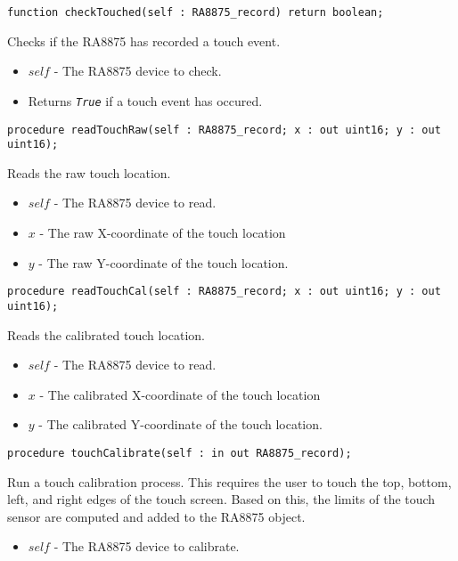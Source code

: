 \documentclass[10pt, openany]{book}
\newcommand{\constant}[1]{\emph{\texttt{#1}}}
\begin{document}
\begin{lstlisting}
function checkTouched(self : RA8875_record) return boolean;
\end{lstlisting}
Checks if the RA8875 has recorded a touch event.
\begin{itemize}
  \item $self$ - The RA8875 device to check.
  \item Returns \constant{True} if a touch event has occured.
\end{itemize}

\begin{lstlisting}
procedure readTouchRaw(self : RA8875_record; x : out uint16; y : out uint16);
\end{lstlisting}
Reads the raw touch location.
\begin{itemize}
  \item $self$ - The RA8875 device to read.
  \item $x$ - The raw X-coordinate of the touch location
  \item $y$ - The raw Y-coordinate of the touch location.
\end{itemize}

\begin{lstlisting}
procedure readTouchCal(self : RA8875_record; x : out uint16; y : out uint16);
\end{lstlisting}
Reads the calibrated touch location.
\begin{itemize}
  \item $self$ - The RA8875 device to read.
  \item $x$ - The calibrated X-coordinate of the touch location
  \item $y$ - The calibrated Y-coordinate of the touch location.
\end{itemize}

\begin{lstlisting}
procedure touchCalibrate(self : in out RA8875_record);
\end{lstlisting}
Run a touch calibration process.  This requires the user to touch the top, bottom, left, and right edges of the touch screen.  Based on this, the limits of the touch sensor are computed and added to the RA8875 object.
\begin{itemize}
  \item $self$ - The RA8875 device to calibrate.
\end{itemize}
\end{document}
